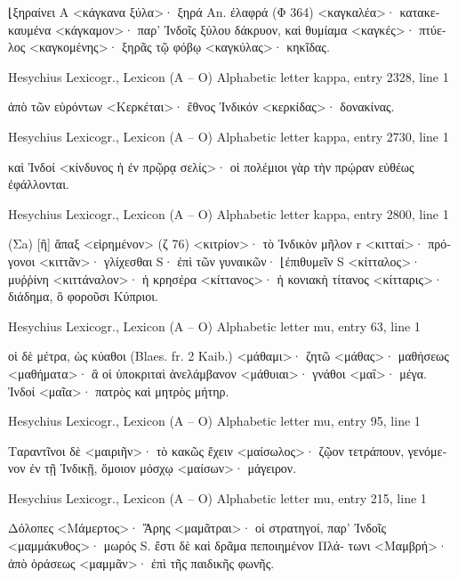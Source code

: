 \documentclass[12pt,letterpaper,twoside,final]{memoir}
\begin{document}
\begin{greek}
                           ⌊ξηραίνει A 
<κάγκανα ξύλα>· ξηρά An. ἐλαφρά (Φ 364) 
<καγκαλέα>· κατακεκαυμένα 
<κάγκαμον>· παρ' Ἰνδοῖς ξύλου δάκρυον, καὶ θυμίαμα 
<καγκές>· πτύελος 
<καγκομένης>· ξηρᾶς τῷ φόβῳ 
<καγκύλας>· κηκῖδας. 



Hesychius Lexicogr., Lexicon (Α – Ο) 
Alphabetic letter kappa, entry 2328, line 1

                                        ἀπὸ τῶν εὑρόντων 
<Κερκέται>· ἔθνος Ἰνδικόν 
<κερκίδας>· δονακίνας. 



Hesychius Lexicogr., Lexicon (Α – Ο) 
Alphabetic letter kappa, entry 2730, line 1

                                                           καὶ Ἰνδοί 
<κίνδυνος ἡ ἐν πρῷρᾳ σελίς>· οἱ πολέμιοι γὰρ τὴν πρῴραν 
 εὐθέως ἐφάλλονται. 



Hesychius Lexicogr., Lexicon (Α – Ο) 
Alphabetic letter kappa, entry 2800, line 1

           (Σa) [ἢ] ἅπαξ <εἰρημένον> (ζ 76) 
<κιτρίον>· τὸ Ἰνδικὸν μῆλον r 
<κιτταί>· πρόγονοι 
<κιττᾶν>· γλίχεσθαι S· ἐπὶ τῶν γυναικῶν· ⌊ἐπιθυμεῖν S 
<κίτταλος>· μυῤῥίνη 
<κιττάναλον>· ἡ κρησέρα 
<κίττανος>· ἡ κονιακὴ τίτανος 
<κίτταρις>· διάδημα, ὃ φοροῦσι Κύπριοι. 



Hesychius Lexicogr., Lexicon (Α – Ο) 
Alphabetic letter mu, entry 63, line 1

                                    οἱ δὲ μέτρα, ὡς κύαθοι (Blaes. fr. 2 
 Kaib.) 
<μάθαμι>· ζητῶ 
<μάθας>· μαθήσεως 
<μαθήματα>· ἃ οἱ ὑποκριταὶ ἀνελάμβανον 
<μάθυιαι>· γνάθοι 
<μαΐ>· μέγα. Ἰνδοί 
<μαῖα>· πατρὸς καὶ μητρὸς μήτηρ. 



Hesychius Lexicogr., Lexicon (Α – Ο) 
Alphabetic letter mu, entry 95, line 1

                              Ταραντῖνοι δὲ <μαιριῆν>· τὸ κακῶς ἔχειν 
<μαίσωλος>· ζῷον τετράπουν, γενόμενον ἐν τῇ Ἰνδικῇ, ὅμοιον 
 μόσχῳ 
<μαίσων>· μάγειρον. 



Hesychius Lexicogr., Lexicon (Α – Ο) 
Alphabetic letter mu, entry 215, line 1

                                  Δόλοπες   
<Μάμερτος>· Ἄρης 
<μαμᾶτραι>· οἱ στρατηγοί, παρ' Ἰνδοῖς 
<μαμμάκυθος>· μωρός S. ἔστι δὲ καὶ δρᾶμα πεποιημένον Πλά-
 τωνι 
<Μαμβρή>· ἀπὸ ὁράσεως 
<μαμμᾶν>· ἐπὶ τῆς παιδικῆς φωνῆς. 




\end{greek}
\end{document}
